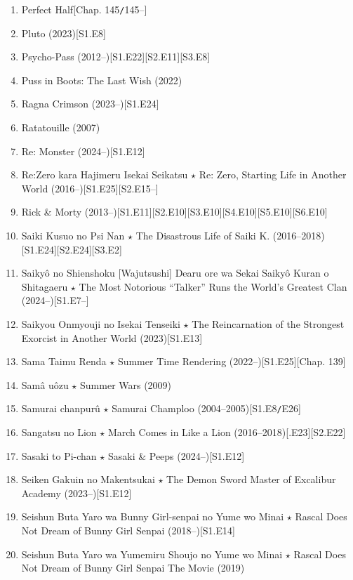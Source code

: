 \documentclass{article}
\begin{document}
\begin{enumerate}
    \item Perfect Half\hfill[Chap. 145{\tt/}145--]
    \item {\sc Pluto} (2023)\hfill[S1.E8]
    \item {\sc Psycho-Pass} (2012--)\hfill[S1.E22][S2.E11][S3.E8]
    \item {\sc Puss in Boots: The Last Wish} (2022)
    \item {\sc Ragna Crimson} (2023--)\hfill[S1.E24]
    \item {\sc Ratatouille} (2007)
    \item {\sc Re: Monster} (2024--)\hfill[S1.E12]
    \item Re:Zero kara Hajimeru Isekai Seikatsu $\star$ Re: Zero, Starting Life in Another World (2016--)\hfill[S1.E25][S2.E15--]
    \item Rick \& Morty (2013--)\hfill[S1.E11][S2.E10][S3.E10][S4.E10][S5.E10][S6.E10]
    \item {\sc Saiki Kusuo no Psi Nan $\star$ The Disastrous Life of Saiki K.} (2016--2018)\hfill[S1.E24][S2.E24][S3.E2]
    \item Saikyô no Shienshoku [Wajutsushi] Dearu ore wa Sekai Saikyô Kuran o Shitagaeru $\star$ The Most Notorious ``Talker'' Runs the World's Greatest Clan (2024--)\hfill[S1.E7--]
    \item {\sc Saikyou Onmyouji no Isekai Tenseiki $\star$ The Reincarnation of the Strongest Exorcist in Another World} (2023)\hfill[S1.E13]
    \item {\sc Sama Taimu Renda $\star$ Summer Time Rendering} (2022--)\hfill[S1.E25][Chap. 139]
    \item {\sc Samâ uôzu $\star$ Summer Wars} (2009)
    \item Samurai chanpurû $\star$ Samurai Champloo (2004--2005)\hfill[S1.E8{\tt/}E26]
    \item {\sc Sangatsu no Lion $\star$ March Comes in Like a Lion} (2016--2018)\hfill[.E23][S2.E22]
    \item {\sc Sasaki to Pi-chan $\star$ Sasaki \& Peeps} (2024--)\hfill[S1.E12]
    \item {\sc Seiken Gakuin no Makentsukai $\star$ The Demon Sword Master of Excalibur Academy} (2023--)\hfill[S1.E12]
    \item {\sc Seishun Buta Yaro wa Bunny Girl-senpai no Yume wo Minai $\star$ Rascal Does Not Dream of Bunny Girl Senpai} (2018--)\hfill[S1.E14]
    \item {\sc Seishun Buta Yaro wa Yumemiru Shoujo no Yume wo Minai $\star$ Rascal Does Not Dream of Bunny Girl Senpai The Movie} (2019)

\end{enumerate}
\end{document}
